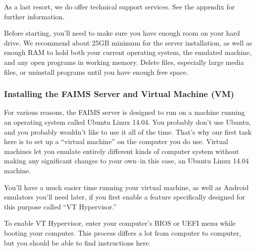 As a last resort, we do offer technical support services. See the appendix for further information.


Before starting, you'll need to make sure you have enough room on your hard drive. We recommend about 25GB minimum for the server installation, as well as enough RAM to hold both your current operating system, the emulated machine, and any open programs in working memory. Delete files, especially large media files, or uninstall programs until you have enough free space.

\subsubsection[installing-the-faims-server-and-virtual-machine-vm]{Installing the FAIMS Server and Virtual Machine (VM)}

For various reasons, the FAIMS server is designed to run on a machine running an operating system called Ubuntu Linux 14.04. You probably don't use Ubuntu, and you probably wouldn't like to use it all of the time. That's why our first task here is to set up a “virtual machine” on the computer you do use. Virtual machines let you emulate entirely different kinds of computer system without making any significant changes to your own--in this case, an Ubuntu Linux 14.04 machine.


You'll have a much easier time running your virtual machine, as well as Android emulators you'll need later, if you first enable a feature specifically designed for this purpose called “VT Hypervisor.”

To enable VT Hypervisor, enter your computer's BIOS or UEFI menu while booting your computer. This process differs a lot from computer to computer, but you should be able to find instructions here.

\from[url2]

{}

